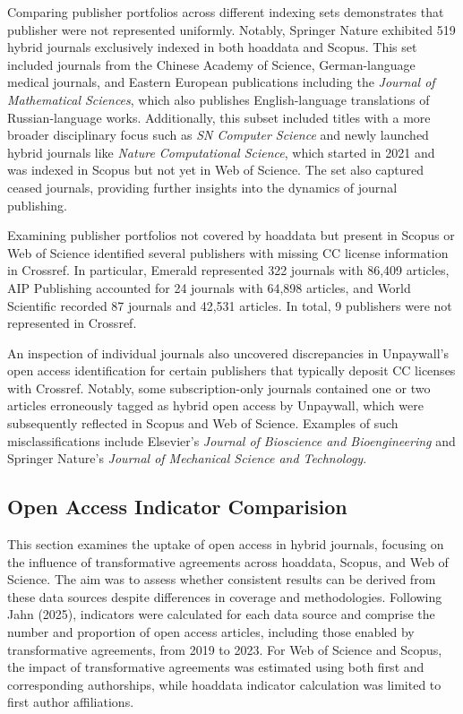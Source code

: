 \documentclass[a4paper,man,floatsintext,longtable,noextraspace,10pt]{apa6}
\begin{document}
Comparing publisher portfolios across different indexing sets
demonstrates that publisher were not represented uniformly. Notably,
Springer Nature exhibited 519 hybrid journals exclusively indexed in
both hoaddata and Scopus. This set included journals from the Chinese
Academy of Science, German-language medical journals, and Eastern
European publications including the \emph{Journal of Mathematical
Sciences}, which also publishes English-language translations of
Russian-language works. Additionally, this subset included titles with a
more broader disciplinary focus such as \emph{SN Computer Science} and
newly launched hybrid journals like \emph{Nature Computational Science},
which started in 2021 and was indexed in Scopus but not yet in Web of
Science. The set also captured ceased journals, providing further
insights into the dynamics of journal publishing.

Examining publisher portfolios not covered by hoaddata but present in
Scopus or Web of Science identified several publishers with missing CC
license information in Crossref. In particular, Emerald represented 322
journals with 86,409 articles, AIP Publishing accounted for 24 journals
with 64,898 articles, and World Scientific recorded 87 journals and
42,531 articles. In total, 9 publishers were not represented in
Crossref.

An inspection of individual journals also uncovered discrepancies in
Unpaywall's open access identification for certain publishers that
typically deposit CC licenses with Crossref. Notably, some
subscription-only journals contained one or two articles erroneously
tagged as hybrid open access by Unpaywall, which were subsequently
reflected in Scopus and Web of Science. Examples of such
misclassifications include Elsevier's \emph{Journal of Bioscience and
Bioengineering} and Springer Nature's \emph{Journal of Mechanical
Science and Technology}.

\subsection{Open Access Indicator
Comparision}\label{open-access-indicator-comparision}

This section examines the uptake of open access in hybrid journals,
focusing on the influence of transformative agreements across hoaddata,
Scopus, and Web of Science. The aim was to assess whether consistent
results can be derived from these data sources despite differences in
coverage and methodologies. Following Jahn (2025), indicators were
calculated for each data source and comprise the number and proportion
of open access articles, including those enabled by transformative
agreements, from 2019 to 2023. For Web of Science and Scopus, the impact
of transformative agreements was estimated using both first and
corresponding authorships, while hoaddata indicator calculation was
limited to first author affiliations.
\end{document}
